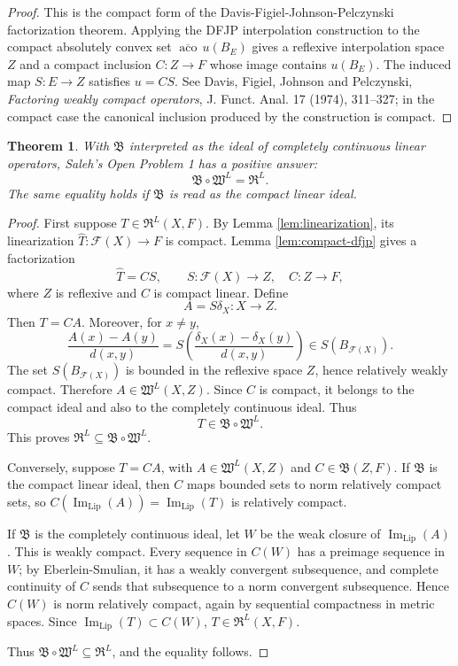 \documentclass[11pt]{article}
\newtheorem{theorem}{Theorem}
\newcommand{\Lip}{\operatorname{Lip}}
\newcommand{\aco}{\operatorname{aco}}
\newcommand{\ImLip}{\operatorname{Im}_{\Lip}}
\newcommand{\F}{\mathcal F}
\newcommand{\W}{\mathfrak W}
\newcommand{\R}{\mathfrak R}
\newcommand{\B}{\mathfrak B}
\begin{document}
\begin{proof}
This is the compact form of the Davis-Figiel-Johnson-Pelczynski factorization theorem.  Applying the DFJP interpolation construction to the compact absolutely convex set \(\overline{\aco}\,u(B_E)\) gives a reflexive interpolation space \(Z\) and a compact inclusion \(C:Z\to F\) whose image contains \(u(B_E)\).  The induced map \(S:E\to Z\) satisfies \(u=CS\).  See Davis, Figiel, Johnson and Pelczynski, \emph{Factoring weakly compact operators}, J. Funct. Anal. 17 (1974), 311--327; in the compact case the canonical inclusion produced by the construction is compact.
\end{proof}

\begin{theorem}
With \(\B\) interpreted as the ideal of completely continuous linear operators, Saleh's Open Problem 1 has a positive answer:
\[
  \B\circ\W^L=\R^L.
\]
The same equality holds if \(\B\) is read as the compact linear ideal.
\end{theorem}

\begin{proof}
First suppose \(T\in\R^L(X,F)\).  By Lemma \ref{lem:linearization}, its linearization \(\widehat T:\F(X)\to F\) is compact.  Lemma \ref{lem:compact-dfjp} gives a factorization
\[
  \widehat T=C S,\qquad S:\F(X)\to Z,\quad C:Z\to F,
\]
where \(Z\) is reflexive and \(C\) is compact linear.  Define
\[
  A=S\delta_X:X\to Z.
\]
Then \(T=C A\).  Moreover, for \(x\ne y\),
\[
 \frac{A(x)-A(y)}{d(x,y)}
   =S\left(\frac{\delta_X(x)-\delta_X(y)}{d(x,y)}\right)\in S(B_{\F(X)}).
\]
The set \(S(B_{\F(X)})\) is bounded in the reflexive space \(Z\), hence relatively weakly compact.  Therefore \(A\in\W^L(X,Z)\).  Since \(C\) is compact, it belongs to the compact ideal and also to the completely continuous ideal.  Thus
\[
  T\in \B\circ\W^L.
\]
This proves \(\R^L\subseteq \B\circ\W^L\).

Conversely, suppose \(T=C A\), with \(A\in\W^L(X,Z)\) and \(C\in\B(Z,F)\).  If \(\B\) is the compact linear ideal, then \(C\) maps bounded sets to norm relatively compact sets, so \(C(\ImLip(A))=\ImLip(T)\) is relatively compact.

If \(\B\) is the completely continuous ideal, let \(W\) be the weak closure of \(\ImLip(A)\).  This is weakly compact.  Every sequence in \(C(W)\) has a preimage sequence in \(W\); by Eberlein-Smulian, it has a weakly convergent subsequence, and complete continuity of \(C\) sends that subsequence to a norm convergent subsequence.  Hence \(C(W)\) is norm relatively compact, again by sequential compactness in metric spaces.  Since \(\ImLip(T)\subset C(W)\), \(T\in\R^L(X,F)\).

Thus \(\B\circ\W^L\subseteq\R^L\), and the equality follows.
\end{proof}
\end{document}
